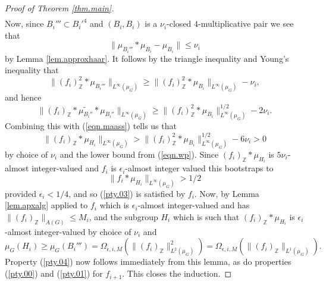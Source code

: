 \documentclass[12pt]{amsart}
\numberwithin{equation}{section}
\theoremstyle{plain}
\theoremstyle{definition}
\renewcommand{\leq}{\leqslant}
\renewcommand{\geq}{\geqslant}
\newcommand{\Z}{\mathbb{Z}}
\begin{document}
\begin{proof}[Proof of Theorem \ref{thm.main}]
\begin{eqnarray*}
\end{eqnarray*}
Now, since $B_i''' \subset B_i'^4$ and $(B_i,B_i)$ is a $\nu_i$-closed $4$-multiplicative pair we see that
\begin{equation*}
\| \mu_{B_i'''}  \ast \mu_{B_i}- \mu_{B_i}\| \leq \nu_i 
\end{equation*}
by Lemma \ref{lem.approxhaar}.  It follows by the triangle inequality and Young's inequality that
\begin{equation*}
\|(f_i)_{\Z}^2 \ast \mu_{B_i'''}\|_{L^\infty(\mu_G)}\geq \|(f_i)_{\Z}^2 \ast \mu_{B_i}\|_{L^\infty(\mu_G)} - \nu_i,
\end{equation*}
and hence
\begin{equation*}
\|(f_i)_\Z \ast \widetilde{\mu_{B_i''}} \ast \mu_{B_i''}\|_{L^\infty(\mu_G)}\geq  \|(f_i)_{\Z}^2 \ast \mu_{B_i}\|_{L^\infty(\mu_G)}^{1/2} - 2\nu_i.
\end{equation*}
Combining this with (\ref{eqn.maass}) tells us that
\begin{equation*}
\|(f_i)_\Z \ast \mu_{H_i}\|_{L^\infty(\mu_G)} > \|(f_i)_\Z^2 \ast \mu_{B_i}\|_{L^\infty(\mu_G)}^{1/2} -6\nu_i>0
\end{equation*}
by choice of $\nu_i$ and the lower bound from (\ref{eqn.wp}).  Since $(f_i)_\Z \ast \mu_{H_i}$ is $5\nu_i$-almost integer-valued and $f_i$ is $\epsilon_i$-almost integer valued this bootstraps to
\begin{equation*}
\|f_i\ast \mu_{H_i}\|_{L^\infty(\mu_G)} >1/2
\end{equation*}
provided $\epsilon_i<1/4$, and so (\ref{pty.03}) is satisfied by $f_i$. Now, by Lemma \ref{lem.apxalg} applied to $f_i$ which is $\epsilon_i$-almost integer-valued and has $\|(f_i)_\Z\|_{A(G)} \leq M_i$, and the subgroup $H_i$ which is such that $(f_i)_\Z\ast \mu_{H_i}$ is $\epsilon_i$-almost integer-valued by choice of $\nu_i$ and
\begin{equation*}
\mu_G(H_i) \geq \mu_G(B_i''') = \Omega_{\epsilon,i,M}(\|(f_i)_\Z\|_{L^2(\mu_G)}^2)= \Omega_{\epsilon,i,M}(\|(f_i)_\Z\|_{L^1(\mu_G)}).
\end{equation*}
Property (\ref{pty.04}) now follows immediately from this lemma, as do properties (\ref{pty.00}) and (\ref{pty.01}) for $f_{i+1}$.  This closes the induction.


\end{proof}
\end{document}
